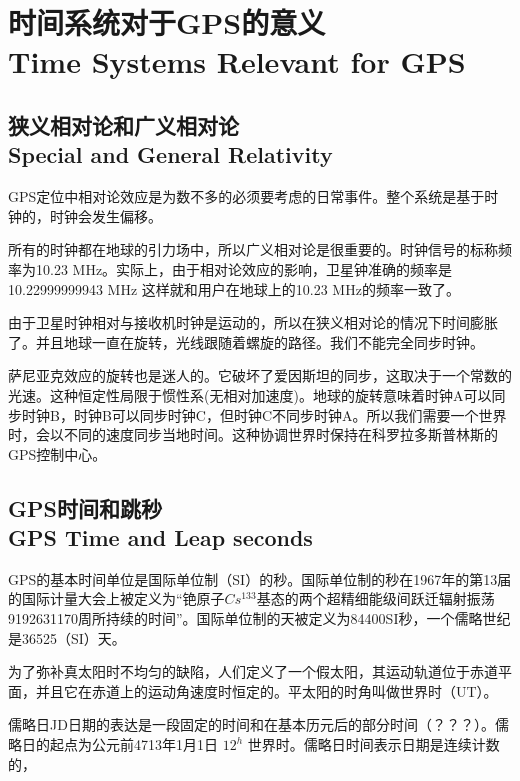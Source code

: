 \section[时间系统对于GPS的意义]{时间系统对于GPS的意义\\Time Systems Relevant for GPS}

	\subsection[狭义相对论和广义相对论]{狭义相对论和广义相对论\\Special and General Relativity}
		
	GPS定位中相对论效应是为数不多的必须要考虑的日常事件。整个系统是基于时钟的，时钟会发生偏移。
	
	所有的时钟都在地球的引力场中，所以广义相对论是很重要的。时钟信号的标称频率为10.23 MHz。实际上，由于相对论效应的影响，卫星钟准确的频率是10.22999999943 MHz 这样就和用户在地球上的10.23 MHz的频率一致了。
	
	由于卫星时钟相对与接收机时钟是运动的，所以在狭义相对论的情况下时间膨胀了。并且地球一直在旋转，光线跟随着螺旋的路径。我们不能完全同步时钟。
	
	萨尼亚克效应的旋转也是迷人的。它破坏了爱因斯坦的同步，这取决于一个常数的光速。这种恒定性局限于惯性系(无相对加速度)。地球的旋转意味着时钟A可以同步时钟B，时钟B可以同步时钟C，但时钟C不同步时钟A。所以我们需要一个世界时，会以不同的速度同步当地时间。这种协调世界时保持在科罗拉多斯普林斯的GPS控制中心。
	
	\subsection[GPS时间和跳秒]{GPS时间和跳秒\\GPS Time and Leap seconds}
	GPS的基本时间单位是国际单位制（SI）的秒。国际单位制的秒在1967年的第13届的国际计量大会上被定义为“铯原子$Cs^133$基态的两个超精细能级间跃迁辐射振荡9192631170周所持续的时间”。国际单位制的天被定义为84400SI秒，一个儒略世纪是36525（SI）天。
	
	为了弥补真太阳时不均匀的缺陷，人们定义了一个假太阳，其运动轨道位于赤道平面，并且它在赤道上的运动角速度时恒定的。平太阳的时角叫做世界时（UT）。

	儒略日JD日期的表达是一段固定的时间和在基本历元后的部分时间（？？？）。儒略日的起点为公元前4713年1月1日 $12^h$ 世界时。儒略日时间表示日期是连续计数的，
	
